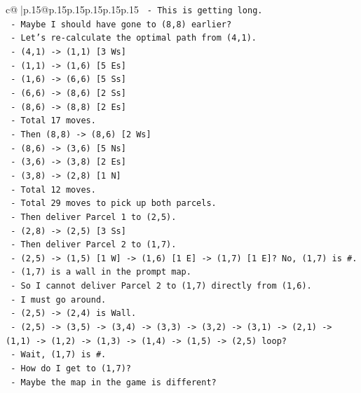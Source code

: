 \documentclass{article}
\begin{document}
{\begin{supertabular}{c@{$\;$}|p{.15\linewidth}@{}p{.15\linewidth}p{.15\linewidth}p{.15\linewidth}p{.15\linewidth}p{.15\linewidth}}
{{{\texttt{       {-} This is getting long.} \\
\texttt{       {-} Maybe I should have gone to (8,8) earlier?} \\
\texttt{       {-} Let's re{-}calculate the optimal path from (4,1).} \\
\texttt{       {-} (4,1) {-}> (1,1) {[}3 Ws{]}} \\
\texttt{       {-} (1,1) {-}> (1,6) {[}5 Es{]}} \\
\texttt{       {-} (1,6) {-}> (6,6) {[}5 Ss{]}} \\
\texttt{       {-} (6,6) {-}> (8,6) {[}2 Ss{]}} \\
\texttt{       {-} (8,6) {-}> (8,8) {[}2 Es{]}} \\
\texttt{       {-} Total 17 moves.} \\
\texttt{       {-} Then (8,8) {-}> (8,6) {[}2 Ws{]}} \\
\texttt{       {-} (8,6) {-}> (3,6) {[}5 Ns{]}} \\
\texttt{       {-} (3,6) {-}> (3,8) {[}2 Es{]}} \\
\texttt{       {-} (3,8) {-}> (2,8) {[}1 N{]}} \\
\texttt{       {-} Total 12 moves.} \\
\texttt{       {-} Total 29 moves to pick up both parcels.} \\
\texttt{       {-} Then deliver Parcel 1 to (2,5).} \\
\texttt{       {-} (2,8) {-}> (2,5) {[}3 Ss{]}} \\
\texttt{       {-} Then deliver Parcel 2 to (1,7).} \\
\texttt{       {-} (2,5) {-}> (1,5) {[}1 W{]} {-}> (1,6) {[}1 E{]} {-}> (1,7) {[}1 E{]}? No, (1,7) is \#.} \\
\texttt{       {-} (1,7) is a wall in the prompt map.} \\
\texttt{       {-} So I cannot deliver Parcel 2 to (1,7) directly from (1,6).} \\
\texttt{       {-} I must go around.} \\
\texttt{       {-} (2,5) {-}> (2,4) is Wall.} \\
\texttt{       {-} (2,5) {-}> (3,5) {-}> (3,4) {-}> (3,3) {-}> (3,2) {-}> (3,1) {-}> (2,1) {-}> (1,1) {-}> (1,2) {-}> (1,3) {-}> (1,4) {-}> (1,5) {-}> (2,5) loop?} \\
\texttt{       {-} Wait, (1,7) is \#.} \\
\texttt{       {-} How do I get to (1,7)?} \\
\texttt{       {-} Maybe the map in the game is different?} \\
}}}
\end{supertabular}}
\end{document}
